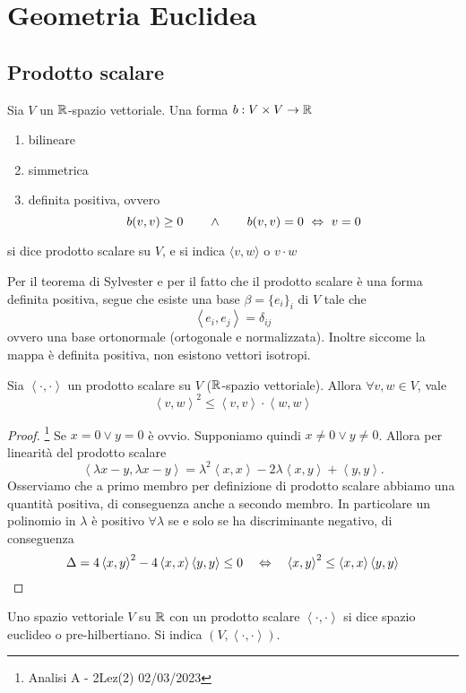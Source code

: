 \documentclass{article}     %
\newcommand{\scp}[1][\cdot,\cdot]{\left\langle #1 \right\rangle}
\begin{document}
\section{Geometria Euclidea}
\subsection{Prodotto scalare}
\begin{boxdef}
    Sia $V$ un $\mathbb{R}$-spazio vettoriale. Una forma $b:V\times V\to \mathbb{R}$ \begin{enumerate}[label=$\roman*)$]
        \item bilineare 
        \item simmetrica
        \item definita positiva, ovvero 
        \[b(v,v)\geq 0\qquad  \land\qquad b(v,v)=0\ \Leftrightarrow\ v=0\]
    \end{enumerate}
    si dice prodotto scalare su $V$, e si indica $\langle v,w \rangle$ o $v\cdot w$
\end{boxdef}
Per il teorema di Sylvester e per il fatto che il prodotto scalare è una forma definita positiva, segue che esiste una base $\beta=\{e_i\}_i$ di $V$ tale che
\[\scp[e_i,e_j]=\delta_{ij}\] 
ovvero una base ortonormale (ortogonale e normalizzata). Inoltre siccome la mappa è definita positiva, non esistono vettori isotropi.

\begin{lemma}
    Sia $\scp$ un prodotto scalare su $V$ ($\mathbb{R}$-spazio vettoriale). Allora $\forall v,w\in V$, vale \[\scp[v,w]^2\leq \scp[v,v]\cdot \scp[w,w]\]
\end{lemma}
\begin{proof}\footnote{Analisi A - 2Lez(2) 02/03/2023}
    Se $x=0\lor y=0$ è ovvio. Supponiamo quindi $x\neq 0\lor y\neq 0$. Allora per linearità del prodotto scalare
    \[\scp[\lambda x-y,\lambda x-y]=\lambda^2\scp[x,x]-2\lambda \scp[x,y]+\scp[y,y].\]
    Osserviamo che a primo membro per definizione di prodotto scalare abbiamo una quantità positiva, di conseguenza anche a secondo membro. In particolare un polinomio in $\lambda$ è positivo $\forall \lambda$ se e solo se ha discriminante negativo, di conseguenza
    \[\Delta=4\scp[x,y]^2-4\scp[x,x]\scp[y,y]\leq 0 \quad \Harr\quad \scp[x,y]^2\leq \scp[x,x]\scp[y,y]\]
\end{proof}

\begin{boxdef}
    Uno spazio vettoriale $V$ su $\mathbb{R}$ con un prodotto scalare $\scp$ si dice spazio euclideo o pre-hilbertiano. Si indica $(V,\scp)$.
\end{boxdef}
\end{document}
